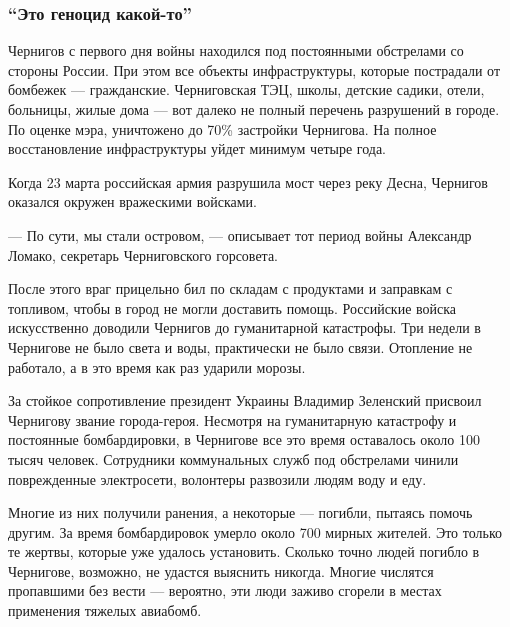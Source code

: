  
 
 
 
 

\subsubsection{\enquote{Это геноцид какой-то}}
\label{sec:17_04_2022.stz.news.ua.strana.1.chernigov.3.genocid}

Чернигов с первого дня войны находился под постоянными обстрелами со стороны
России. При этом все объекты инфраструктуры, которые пострадали от бомбежек —
гражданские. Черниговская ТЭЦ, школы, детские садики, отели, больницы, жилые
дома — вот далеко не полный перечень разрушений в городе. По оценке мэра,
уничтожено до 70\% застройки Чернигова. На полное восстановление инфраструктуры
уйдет минимум четыре года. 

Когда 23 марта российская армия разрушила мост через реку Десна, Чернигов
оказался окружен вражескими войсками. 

— По сути, мы стали островом, — описывает тот период войны Александр Ломако,
секретарь Черниговского горсовета.

После этого враг прицельно бил по складам с продуктами и заправкам с топливом,
чтобы в город не могли доставить помощь. Российские войска искусственно
доводили Чернигов до гуманитарной катастрофы. Три недели в Чернигове не было
света и воды, практически не было связи. Отопление не работало, а в это время
как раз ударили морозы. 

За стойкое сопротивление президент Украины Владимир Зеленский присвоил
Чернигову звание города-героя. Несмотря на гуманитарную катастрофу и постоянные
бомбардировки, в Чернигове все это время оставалось около 100 тысяч человек.
Сотрудники коммунальных служб под обстрелами чинили поврежденные электросети,
волонтеры развозили людям воду и еду. 

Многие из них получили ранения, а некоторые — погибли, пытаясь помочь другим.
За время бомбардировок умерло около 700 мирных жителей. Это только те жертвы,
которые уже удалось установить. Сколько точно людей погибло в Чернигове,
возможно, не удастся выяснить никогда. Многие числятся пропавшими без вести —
вероятно, эти люди заживо сгорели в местах применения тяжелых авиабомб.

